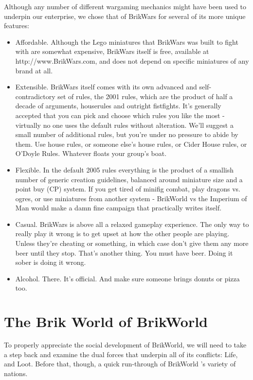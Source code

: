 \documentclass[12pt,a4paper,twocolumn]{article}
\begin{document}
Although any number of different wargaming mechanics might have been used to underpin our enterprise, we chose that of BrikWars for several of its more unique features:
\begin {itemize}
	\item Affordable.  Although the Lego miniatures that BrikWars was built to fight with are somewhat expensive, BrikWars itself is free, available at http://www.BrikWars.com, and does not depend on specific miniatures of any brand at all.
    \item Extensible.  BrikWars itself comes with its own advanced and self-contradictory set of rules, the 2001 rules, which are the product of half a decade of arguments, houserules and outright fistfights.  It's generally accepted that you can pick and choose which rules you like the most - virtually no one uses the default rules without alteration.  We'll suggest a small number of additional rules, but you're under no pressure to abide by them.  Use house rules, or someone else's house rules, or Cider House rules, or O'Doyle Rules.  Whatever floats your group's boat.
    \item Flexible.  In the default 2005 rules everything is the product of a smallish number of generic creation guidelines, balanced around miniature size and a point buy (CP) system.  If you get tired of minifig combat, play dragons vs. ogres, or use miniatures from another system - BrikWorld vs the Imperium of Man would make a damn fine campaign that practically writes itself.
	\item Casual.  BrikWars is above all a relaxed gameplay experience.  The only way to really play it wrong is to get upset at how the other people are playing.  Unless they're cheating or something, in which case don't give them any more beer until they stop.  That's another thing.  You must have beer.  Doing it sober is doing it wrong.
    \item Alcohol.  There.  It's official.  And make sure someone brings donuts or pizza too.
\end{itemize}


\section{The Brik World of BrikWorld}
To properly appreciate the social development of BrikWorld, we will need to take a step back and examine the dual forces that underpin all of its conflicts: Life, and Loot.  Before that, though, a quick run-through of BrikWorld 's variety of nations.
\end{document}
